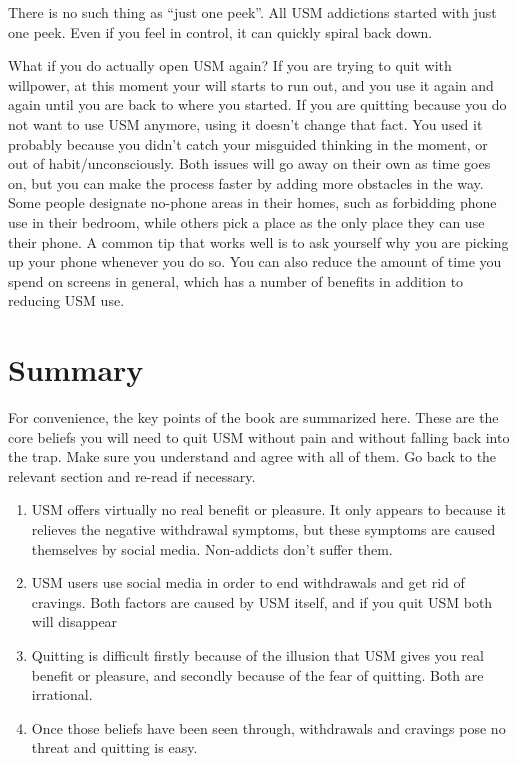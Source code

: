 \documentclass[
  openany]{book}
\providecommand{\tightlist}{%
  \setlength{\itemsep}{0pt}\setlength{\parskip}{0pt}}
\newenvironment{rmdcaution}{
\color{red}
\begin{framed}}{\end{framed}}
\begin{document}
\begin{rmdcaution}
There is no such thing as ``just one peek''. All USM addictions started with just one peek. Even if you feel in control, it can quickly spiral back down.

\end{rmdcaution}

What if you do actually open USM again? If you are trying to quit with willpower, at this moment your will starts to run out, and you use it again and again until you are back to where you started. If you are quitting because you do not want to use USM anymore, using it doesn't change that fact. You used it probably because you didn't catch your misguided thinking in the moment, or out of habit/unconsciously. Both issues will go away on their own as time goes on, but you can make the process faster by adding more obstacles in the way. Some people designate no-phone areas in their homes, such as forbidding phone use in their bedroom, while others pick a place as the only place they can use their phone. A common tip that works well is to ask yourself why you are picking up your phone whenever you do so. You can also reduce the amount of time you spend on screens in general, which has a number of benefits in addition to reducing USM use.

\chapter{Summary}\label{summary}

For convenience, the key points of the book are summarized here. These are the core beliefs you will need to quit USM without pain and without falling back into the trap. Make sure you understand and agree with all of them. Go back to the relevant section and re-read if necessary.

\begin{enumerate}
\def\labelenumi{\arabic{enumi}.}
\tightlist
\item
  USM offers virtually no real benefit or pleasure. It only appears to because it relieves the negative withdrawal symptoms, but these symptoms are caused themselves by social media. Non-addicts don't suffer them.
\item
  USM users use social media in order to end withdrawals and get rid of cravings. Both factors are caused by USM itself, and if you quit USM both will disappear
\item
  Quitting is difficult firstly because of the illusion that USM gives you real benefit or pleasure, and secondly because of the fear of quitting. Both are irrational.
\item
  Once those beliefs have been seen through, withdrawals and cravings pose no threat and quitting is easy.
\end{enumerate}
\end{document}
